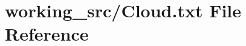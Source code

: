 \hypertarget{_cloud_8txt}{}\section{working\+\_\+src/\+Cloud.txt File Reference}
\label{_cloud_8txt}
